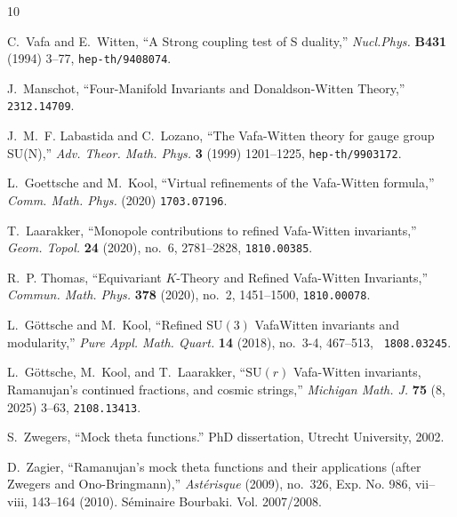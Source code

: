\documentclass[12pt,letterpaper]{JHEP3}
\begin{document}
\providecommand{\href}[2]{#2}\begingroup\raggedright\begin{thebibliography}{10}
	
	C.~Vafa and E.~Witten, ``{A Strong coupling test of S duality},'' {\em
		Nucl.Phys.} {\bf B431} (1994) 3--77,
	\href{http://www.arXiv.org/abs/hep-th/9408074}{{\tt hep-th/9408074}}.
	
	J.~Manschot, ``{Four-Manifold Invariants and Donaldson-Witten Theory},''
	\href{http://www.arXiv.org/abs/2312.14709}{{\tt 2312.14709}}.
	
	J.~M.~F. Labastida and C.~Lozano, ``{The Vafa-Witten theory for gauge group
		SU(N)},'' {\em Adv. Theor. Math. Phys.} {\bf 3} (1999) 1201--1225,
	\href{http://www.arXiv.org/abs/hep-th/9903172}{{\tt hep-th/9903172}}.
	
	L.~Goettsche and M.~Kool, ``{Virtual refinements of the Vafa-Witten formula},''
	{\em Comm. Math. Phys.} (2020)
	\href{http://www.arXiv.org/abs/1703.07196}{{\tt 1703.07196}}.
	
	T.~Laarakker, ``{Monopole contributions to refined Vafa-Witten invariants},''
	{\em Geom. Topol.} {\bf 24} (2020), no.~6, 2781--2828,
	\href{http://www.arXiv.org/abs/1810.00385}{{\tt 1810.00385}}.
	
	R.~P. Thomas, ``{Equivariant $K$-Theory and Refined Vafa-Witten Invariants},''
	{\em Commun. Math. Phys.} {\bf 378} (2020), no.~2, 1451--1500,
	\href{http://www.arXiv.org/abs/1810.00078}{{\tt 1810.00078}}.
	
	L.~G\"ottsche and M.~Kool, ``{Refined $\mathrm{SU}(3)$ Vafa\textendash{}Witten
		invariants and modularity},'' {\em Pure Appl. Math. Quart.} {\bf 14} (2018),
	no.~3-4, 467--513, \href{http://www.arXiv.org/abs/1808.03245}{{\tt
			1808.03245}}.
	
	L.~G\"ottsche, M.~Kool, and T.~Laarakker, ``{$\mathrm{SU}(r)$ Vafa-Witten
		invariants, Ramanujan's continued fractions, and cosmic strings},'' {\em
		Michigan Math. J.} {\bf 75} (8, 2025) 3--63,
	\href{http://www.arXiv.org/abs/2108.13413}{{\tt 2108.13413}}.
	
	S.~Zwegers, ``Mock theta functions.'' PhD dissertation, Utrecht University,
	2002.
	
	D.~Zagier, ``Ramanujan's mock theta functions and their applications (after
	{Z}wegers and {O}no-{B}ringmann),'' {\em Ast\'erisque} (2009), no.~326, Exp.
	No. 986, vii--viii, 143--164 (2010). S{\'e}minaire Bourbaki. Vol. 2007/2008.
	

\end{thebibliography}
\end{document}

